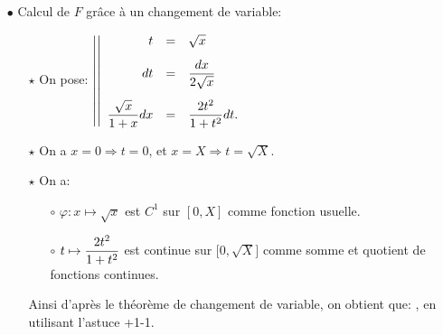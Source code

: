 \documentclass[a4paper, 11pt,reqno]{article}
\begin{document}
\begin{correction}
\begin{enumerate}
\begin{itemize}
			      \item[$\bullet$] Calcul de $F$ gr\^{a}ce \`{a} un changement de variable:
			            \begin{itemize}
				            \item[$\star$] On pose: $\left| \left|\begin{array}{rll}
						                  t                             & = & \sqrt{x}\vsec                  \\
						                  dt                            & = & \ddp\frac{dx}{2\sqrt{x}} \vsec \\
						                  \ddp\frac{\sqrt{x}}{ 1+x}  dx & = & \ddp\frac{2t^2}{1+t^2}dt.
					                  \end{array}\right.\right.$
				            \item[$\star$] On a $x=0 \Rightarrow t=0$, et $x=X \Rightarrow t= \sqrt{X}$.
				            \item[$\star$] On a:
				                  \begin{itemize}
					                  \item[$\circ$] $\varphi: x\mapsto \sqrt{x}$ est $C^1$ sur $\left\lbrack 0,X \right\rbrack$ comme fonction usuelle.
					                  \item[$\circ$] $t\mapsto  \displaystyle\frac{2t^2}{1+t^2}$ est continue sur $\lbrack 0,\sqrt{X}\rbrack$ comme somme et quotient de fonctions continues.
				                  \end{itemize}
				                  Ainsi d'apr\`{e}s le th\'eor\`{e}me de changement de variable, on obtient que:
				                  ,
				                  en utilisant l'astuce +1-1.
			            \end{itemize}
		      \end{itemize}


\end{enumerate}
\end{correction}
\end{document}
